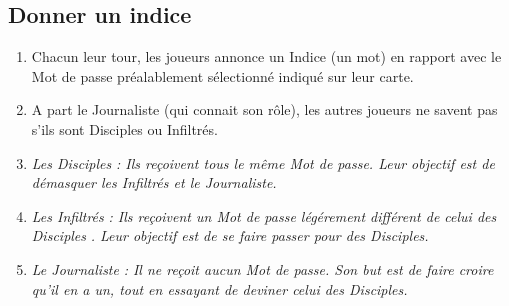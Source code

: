 \documentclass{article}%
\begin{document}
\subsection{ Donner un indice
}%
\label{subsec:Donnerunindice}%
\begin{enumerate}%
\item%
%
 Chacun leur tour, les joueurs annonce un Indice (un mot) en rapport avec le Mot de passe préalablement sélectionné indiqué sur leur carte.
%
\item%
%
 A part le Journaliste (qui connait son rôle), les autres joueurs ne savent pas s'ils sont Disciples ou Infiltrés.
%
\item%
%
\textit{Les Disciples}%
\textit{ : Ils reçoivent tous le même Mot de passe. Leur objectif est de démasquer les Infiltrés et le Journaliste.
}%
\item%
%
\textit{Les Infiltrés}%
\textit{ : Ils reçoivent un Mot de passe légérement différent de celui des }%
\textit{Disciples}%
\textit{. Leur objectif est de se faire passer pour des Disciples.
}%
\item%
%
\textit{Le Journaliste}%
\textit{ : Il ne reçoit aucun Mot de passe. Son but est de faire croire qu'il en a un, tout en essayant de deviner celui des Disciples.
}%
\end{enumerate}

%
\end{document}
